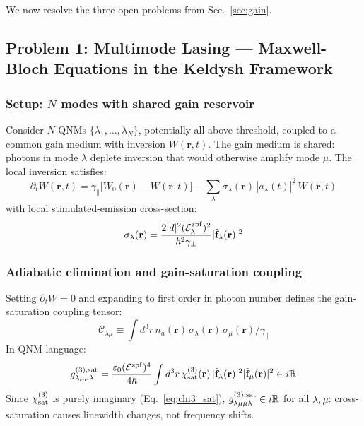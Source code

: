 \documentclass[12pt]{article}
\newcommand{\zpf}{{\rm zpf}}
\newcommand{\tf}{\tilde{\mathbf{f}}}
\begin{document}
We now resolve the three open problems from Sec.~\ref{sec:gain}.

\subsection{Problem 1: Multimode Lasing --- Maxwell-Bloch Equations
in the Keldysh Framework}
\label{sec:multimode_lasing}

\subsubsection*{Setup: $N$ modes with shared gain reservoir}

Consider $N$ QNMs $\{\lambda_1,\ldots,\lambda_N\}$, potentially all
above threshold, coupled to a common gain medium with inversion
$W(\mathbf{r},t)$.  The gain medium is shared: photons in mode
$\lambda$ deplete inversion that would otherwise amplify mode $\mu$.
The local inversion satisfies:
\begin{equation}
  \partial_t W(\mathbf{r},t) =
  \gamma_\parallel\bigl[W_0(\mathbf{r}) - W(\mathbf{r},t)\bigr]
  - \sum_\lambda \sigma_\lambda(\mathbf{r})\,
  |a_\lambda(t)|^2\,W(\mathbf{r},t)
  \label{eq:bloch_W}
\end{equation}
with local stimulated-emission cross-section:
\begin{equation}
  \sigma_\lambda(\mathbf{r}) =
  \frac{2|d|^2(\mathcal{E}_\lambda^\zpf)^2}{\hbar^2\gamma_\perp}
  |\tf_\lambda(\mathbf{r})|^2
  \label{eq:sigma_lambda}
\end{equation}

\subsubsection*{Adiabatic elimination and gain-saturation coupling}

Setting $\partial_t W = 0$ and expanding to first order in photon
number defines the gain-saturation coupling tensor:
\begin{equation}
  \mathcal{C}_{\lambda\mu} \equiv
  \int d^3r\, n_a(\mathbf{r})\,\sigma_\lambda(\mathbf{r})\,
  \sigma_\mu(\mathbf{r})/\gamma_\parallel
  \label{eq:C_tensor}
\end{equation}
In QNM language:
\begin{equation}
  g^{(3),\rm sat}_{\lambda\mu\mu\lambda} =
  \frac{\varepsilon_0(\mathcal{E}^\zpf)^4}{4\hbar}
  \int d^3r\,\chi^{(3)}_{\rm sat}(\mathbf{r})\,
  |\tf_\lambda(\mathbf{r})|^2
  |\tf_\mu(\mathbf{r})|^2
  \in i\mathbb{R}
  \label{eq:g3_cross_sat}
\end{equation}
Since $\chi^{(3)}_{\rm sat}$ is purely imaginary (Eq.~\ref{eq:chi3_sat}),
$g^{(3),\rm sat}_{\lambda\mu\mu\lambda}\in i\mathbb{R}$ for all
$\lambda,\mu$: cross-saturation causes linewidth changes, not frequency
shifts.
\end{document}
